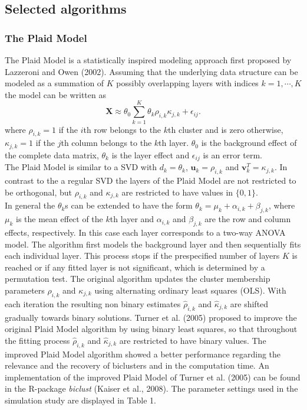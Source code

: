 \subsection{Selected algorithms}
\subsubsection{The Plaid Model}
The Plaid Model is a statistically inspired modeling approach first proposed by Lazzeroni and Owen (2002). Assuming that the underlying data structure can be modeled as a summation of $K$ possibly overlapping layers with indices $k=1,\cdots,K$ the model can be written as 
\begin{equation}
\mathbf{X} \approx \theta_{0} \sum_{k=1}^{K} \theta_{k} \rho_{i,k} \kappa_{j,k} + \epsilon_{ij}.
\end{equation}
where $\rho_{i,k}=1$ if the $i$th row belongs to the $k$th cluster and is zero otherwise, $\kappa_{j,k}=1$ if the $j$th column belongs to the $k$th layer.
$\theta_{0}$ is the background effect of the complete data matrix, $\theta_{k}$ is the layer effect and $\epsilon_{ij}$ is an error term. \\
The Plaid Model is similar to a SVD with $d_{k}=\theta_{k}$, $\mathbf{u}_{k}=\rho_{i,k}$ and $\mathbf{v}_{k}^{T}=\kappa_{j,k}$. In contrast to the a regular SVD the layers of the Plaid Model are not restricted to be orthogonal, but $\rho_{i,k}$ and $\kappa_{j,k}$ are restricted to have values in $\{0,1\}$.\\
In general the $\theta_{k}$s can be extended to have the form $\theta_{k}=\mu_{k}+\alpha_{i,k}+\beta_{j,k}$, where $\mu_{k}$ is the mean effect of the $k$th layer and 
$\alpha_{i,k}$ and $\beta_{j,k}$ are the row and column effects, respectively. In this case each layer corresponds to a two-way ANOVA model.
The algorithm first models the background layer and then sequentially fits each individual layer. This process stops if the prespecified number of layers $K$ is reached or if any fitted layer is not significant, which is determined by a permutation test. The original algorithm updates the cluster membership parameters $\rho_{i,k}$ and $\kappa_{j,k}$ using alternating ordinary least squares (OLS). With each iteration the resulting non binary estimates $\hat{\rho}_{i,k}$ and $\hat{\kappa}_{j,k}$ are shifted gradually towards binary solutions. Turner et al. (2005) proposed to improve the original Plaid Model algorithm by using binary least squares, so that throughout the fitting process $\hat{\rho}_{i,k}$ and $\hat{\kappa}_{j,k}$ are restricted to have binary values. The improved Plaid Model algorithm showed a better performance regarding the relevance and the recovery of biclusters and in the computation time. An implementation of the improved Plaid Model of Turner et al. (2005) can be found in the R-package \textit{biclust} (Kaiser et al., 2008). The parameter settings used in the simulation study are displayed in Table 1.   

